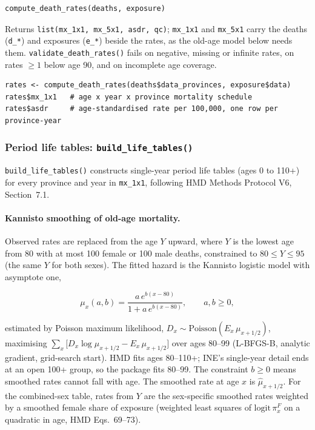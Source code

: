 \documentclass[11pt]{article}
\newcommand{\fn}[1]{\texttt{#1}}
\begin{document}
\begin{lstlisting}
compute_death_rates(deaths, exposure)
\end{lstlisting}

Returns \fn{list(mx\_1x1, mx\_5x1, asdr, qc)}; \fn{mx\_1x1} and
\fn{mx\_5x1} carry the deaths (\fn{d\_*}) and exposures (\fn{e\_*}) beside
the rates, as the old-age model below needs them.
\fn{validate\_death\_rates()} fails on negative, missing or infinite rates,
on rates $\geq 1$ below age 90, and on incomplete age coverage.

\begin{lstlisting}
rates <- compute_death_rates(deaths$data_provinces, exposure$data)
rates$mx_1x1   # age x year x province mortality schedule
rates$asdr     # age-standardised rate per 100,000, one row per province-year
\end{lstlisting}

\subsubsection{Period life tables: \fn{build\_life\_tables()}}
\label{sec:lifetables}

\fn{build\_life\_tables()} constructs single-year period life tables
(ages 0 to 110+) for every province and year in \fn{mx\_1x1}, following
HMD Methods Protocol V6, Section~7.1.

\paragraph{Kannisto smoothing of old-age mortality.} Observed rates are
replaced from the age $Y$ upward, where $Y$ is the lowest age from 80 with
at most 100 female or 100 male deaths, constrained to $80 \le Y \le 95$
(the same $Y$ for both sexes). The fitted hazard is the Kannisto logistic
model with asymptote one,

\begin{equation}
\mu_x(a,b) = \frac{a\,e^{b(x-80)}}{1 + a\,e^{b(x-80)}}, \qquad a, b \ge 0,
\end{equation}

estimated by Poisson maximum likelihood, $D_x \sim \mathrm{Poisson}(E_x\,
\mu_{x+1/2})$, maximising
$\sum_x \bigl[D_x \log \mu_{x+1/2} - E_x\, \mu_{x+1/2}\bigr]$ over ages
80--99 (L-BFGS-B, analytic gradient, grid-search start). HMD fits ages
80--110+; INE's single-year detail ends at an open 100+ group, so the
package fits 80--99. The constraint $b \ge 0$ means smoothed rates cannot
fall with age. The smoothed rate at age $x$ is $\hat\mu_{x+1/2}$.
For the combined-sex table, rates from $Y$ are the sex-specific smoothed
rates weighted by a smoothed female share of exposure (weighted least
squares of $\mathrm{logit}\,\pi^F_x$ on a quadratic in age, HMD Eqs.~69--73).
\end{document}
